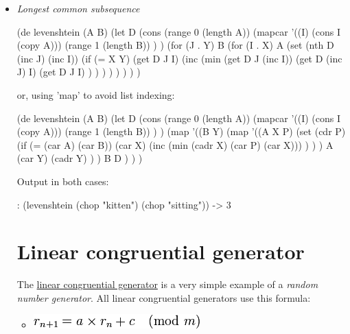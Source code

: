 \begin{itemize}
\item
  \emph{Longest common subsequence}

\begin{wideverbatim}

(de levenshtein (A B)
   (let D
      (cons
         (range 0 (length A))
         (mapcar
            '((I) (cons I (copy A)))
            (range 1 (length B)) ) )
      (for (J . Y) B
         (for (I . X) A
            (set
               (nth D (inc J) (inc I))
               (if (= X Y)
                  (get D J I)
                  (inc
                     (min
                        (get D J (inc I))
                        (get D (inc J) I)
                        (get D J I) ) ) ) ) ) ) ) )

or, using 'map' to avoid list indexing:

(de levenshtein (A B)
   (let D
      (cons
         (range 0 (length A))
         (mapcar
            '((I) (cons I (copy A)))
            (range 1 (length B)) ) )
      (map
         '((B Y)
            (map
               '((A X P)
                  (set (cdr P)
                     (if (= (car A) (car B))
                        (car X)
                        (inc (min (cadr X) (car P) (car X))) ) ) )
               A
               (car Y)
               (cadr Y) ) )
         B
         D ) ) )

Output in both cases:

: (levenshtein (chop "kitten") (chop "sitting"))
-> 3

\end{wideverbatim}

\pagebreak{}
\section*{Linear congruential generator}

The
\href{http://en.wikipedia.org/wiki/linear\_congruential\_generator}{linear
  congruential generator} is a very simple example of a \emph{random
  number generator}. All linear congruential generators use this
formula:

\begin{itemize}
\item
  \includegraphics[scale=.6]{graphics/25e1b8e2f59974728e2a729ad51ba0bd.png}
\end{itemize}


\end{itemize}
